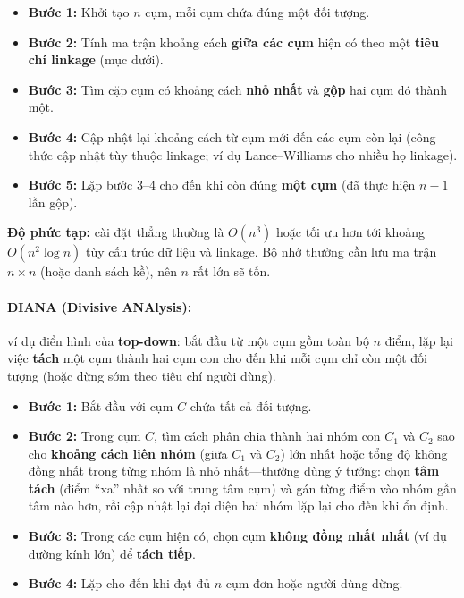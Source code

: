 \documentclass[10pt]{article}
\begin{document}
\begin{itemize}
    \item \textbf{Bước 1:} Khởi tạo $n$ cụm, mỗi cụm chứa đúng một đối tượng.
    \item \textbf{Bước 2:} Tính ma trận khoảng cách \textbf{giữa các cụm} hiện có theo một \textbf{tiêu chí linkage} (mục dưới).
    \item \textbf{Bước 3:} Tìm cặp cụm có khoảng cách \textbf{nhỏ nhất} và \textbf{gộp} hai cụm đó thành một.
    \item \textbf{Bước 4:} Cập nhật lại khoảng cách từ cụm mới đến các cụm còn lại (công thức cập nhật tùy thuộc linkage; ví dụ Lance--Williams cho nhiều họ linkage).
    \item \textbf{Bước 5:} Lặp bước 3--4 cho đến khi còn đúng \textbf{một cụm} (đã thực hiện $n-1$ lần gộp).
\end{itemize}

\textbf{Độ phức tạp:} cài đặt thẳng thường là $O(n^3)$ hoặc tối ưu hơn tới khoảng $O(n^2 \log n)$ tùy cấu trúc dữ liệu và linkage. Bộ nhớ thường cần lưu ma trận $n \times n$ (hoặc danh sách kề), nên $n$ rất lớn sẽ tốn.

\paragraph{DIANA (Divisive ANAlysis):}
ví dụ điển hình của \textbf{top-down}: bắt đầu từ một cụm gồm toàn bộ $n$ điểm, lặp lại việc \textbf{tách} một cụm thành hai cụm con cho đến khi mỗi cụm chỉ còn một đối tượng (hoặc dừng sớm theo tiêu chí người dùng).

\begin{itemize}
    \item \textbf{Bước 1:} Bắt đầu với cụm $C$ chứa tất cả đối tượng.
    \item \textbf{Bước 2:} Trong cụm $C$, tìm cách phân chia thành hai nhóm con $C_1$ và $C_2$ sao cho \textbf{khoảng cách liên nhóm} (giữa $C_1$ và $C_2$) lớn nhất hoặc tổng độ không đồng nhất trong từng nhóm là nhỏ nhất---thường dùng ý tưởng: chọn \textbf{tâm tách} (điểm ``xa'' nhất so với trung tâm cụm) và gán từng điểm vào nhóm gần tâm nào hơn, rồi cập nhật lại đại diện hai nhóm lặp lại cho đến khi ổn định.
    \item \textbf{Bước 3:} Trong các cụm hiện có, chọn cụm \textbf{không đồng nhất nhất} (ví dụ đường kính lớn) để \textbf{tách tiếp}.
    \item \textbf{Bước 4:} Lặp cho đến khi đạt đủ $n$ cụm đơn hoặc người dùng dừng.
\end{itemize}
\end{document}
